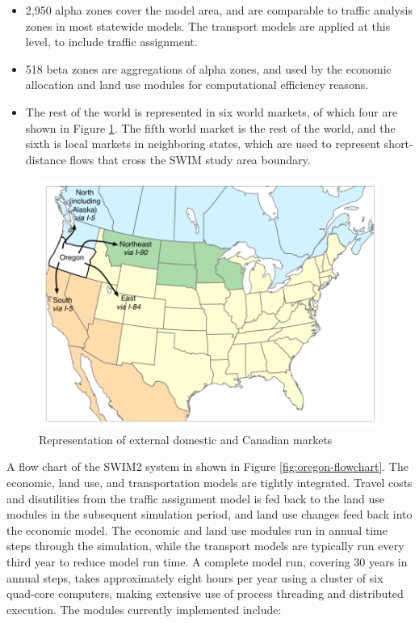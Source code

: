 \begin{itemize}
\item
2,950 alpha zones cover the model area, and are comparable to traffic analysis zones in most statewide models. The transport models are applied at this level, to include traffic assignment.
\item
518 beta zones are aggregations of alpha zones, and used by the economic allocation and land use modules for computational efficiency reasons.
\item
The rest of the world is represented in six world markets, of which four are shown in Figure \ref{fig:oregon-externals}. The fifth world market is the rest of the world, and the sixth is local markets in neighboring states, which are used to represent short-distance flows that cross the SWIM study area boundary.
\end{itemize}

\begin{figure}[!t]
\centering
\includegraphics[width=6.4in]{graphics/57-external-and-Canadian-markets}
\caption{Representation of external domestic and Canadian markets}
\label{fig:oregon-externals}
\end{figure}

A flow chart of the SWIM2 system in shown in Figure \ref{fig:oregon-flowchart}. The economic, land use, and transportation models are tightly integrated. Travel costs and disutilities from the traffic assignment model is fed back to the land use modules in the subsequent simulation period, and land use changes feed back into the economic model. The economic and land use modules run in annual time steps through the simulation, while the transport models are typically run every third year to reduce model run time. A complete model run, covering 30 years in annual steps, takes approximately eight hours per year using a cluster of six quad-core computers, making extensive use of process threading and distributed execution. The modules currently implemented include:

